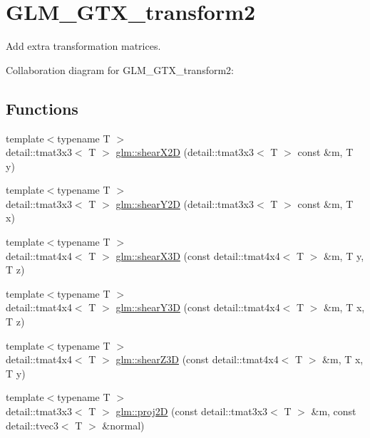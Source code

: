 \hypertarget{group__gtx__transform2}{}\section{G\+L\+M\+\_\+\+G\+T\+X\+\_\+transform2}
\label{group__gtx__transform2}


Add extra transformation matrices.  


Collaboration diagram for G\+L\+M\+\_\+\+G\+T\+X\+\_\+transform2\+:
\subsection*{Functions}
\begin{DoxyCompactItemize}
\item 
{\footnotesize template$<$typename T $>$ }\\detail\+::tmat3x3$<$ T $>$ \hyperlink{group__gtx__transform2_gadddd52c978f045f5f8dca53495b9ae61}{glm\+::shear\+X2\+D} (detail\+::tmat3x3$<$ T $>$ const \&m, T y)
\item 
{\footnotesize template$<$typename T $>$ }\\detail\+::tmat3x3$<$ T $>$ \hyperlink{group__gtx__transform2_gad6911c0aa16802530d2344633074d23c}{glm\+::shear\+Y2\+D} (detail\+::tmat3x3$<$ T $>$ const \&m, T x)
\item 
{\footnotesize template$<$typename T $>$ }\\detail\+::tmat4x4$<$ T $>$ \hyperlink{group__gtx__transform2_gada3d1377736da971fd1d33b5749d4dd3}{glm\+::shear\+X3\+D} (const detail\+::tmat4x4$<$ T $>$ \&m, T y, T z)
\item 
{\footnotesize template$<$typename T $>$ }\\detail\+::tmat4x4$<$ T $>$ \hyperlink{group__gtx__transform2_ga48f777ba390f40b93c2b0ace7523bbdf}{glm\+::shear\+Y3\+D} (const detail\+::tmat4x4$<$ T $>$ \&m, T x, T z)
\item 
{\footnotesize template$<$typename T $>$ }\\detail\+::tmat4x4$<$ T $>$ \hyperlink{group__gtx__transform2_ga9e8ec50d810af7f3da402ef120b37e3f}{glm\+::shear\+Z3\+D} (const detail\+::tmat4x4$<$ T $>$ \&m, T x, T y)
\item 
{\footnotesize template$<$typename T $>$ }\\detail\+::tmat3x3$<$ T $>$ \hyperlink{group__gtx__transform2_ga63ac40786b580f12561cd69df85b62ab}{glm\+::proj2\+D} (const detail\+::tmat3x3$<$ T $>$ \&m, const detail\+::tvec3$<$ T $>$ \&normal)

\end{DoxyCompactItemize}
